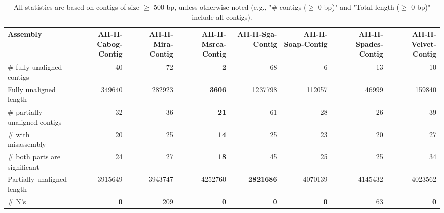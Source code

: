 \documentclass[12pt,a4paper]{article}
\begin{document}
\begin{table}[ht]
\begin{center}
\caption{All statistics are based on contigs of size $\geq$ 500 bp, unless otherwise noted (e.g., "\# contigs ($\geq$ 0 bp)" and "Total length ($\geq$ 0 bp)" include all contigs).}
\begin{tabular}{|l*{7}{|r}|}
\hline
Assembly & AH-H-Cabog-Contig & AH-H-Mira-Contig & AH-H-Msrca-Contig & AH-H-Sga-Contig & AH-H-Soap-Contig & AH-H-Spades-Contig & AH-H-Velvet-Contig \\ \hline
\# fully unaligned contigs & 40 & 72 & {\bf 2} & 68 & 6 & 13 & 10 \\ \hline
Fully unaligned length & 349640 & 282923 & {\bf 3606} & 1237798 & 112057 & 46999 & 159840 \\ \hline
\# partially unaligned contigs & 32 & 36 & {\bf 21} & 61 & 28 & 26 & 39 \\ \hline
\hspace{5mm}\# with misassembly & 20 & 25 & {\bf 14} & 25 & 23 & 20 & 27 \\ \hline
\hspace{5mm}\# both parts are significant & 24 & 27 & {\bf 18} & 45 & 25 & 25 & 34 \\ \hline
Partially unaligned length & 3915649 & 3943747 & 4252760 & {\bf 2821686} & 4070139 & 4145432 & 4023562 \\ \hline
\# N's & {\bf 0} & 209 & {\bf 0} & {\bf 0} & {\bf 0} & 63 & {\bf 0} \\ \hline
\end{tabular}
\end{center}
\end{table}
\end{document}
